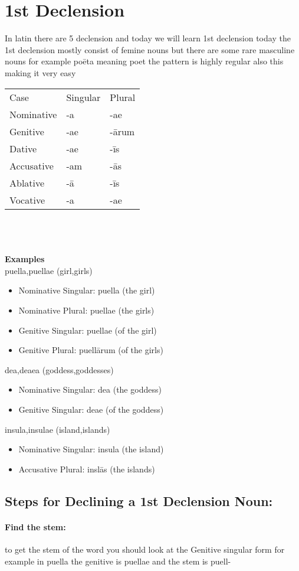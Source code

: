 \section*{1st Declension}
In latin there are 5 declension and today we will learn 1st 
declension today the 1st declension mostly consist of femine
nouns but there are some rare masculine nouns for example poēta meaning poet
the pattern is highly regular also this making it very easy \\
\begin{tabular}{lll}
  Case & Singular & Plural \\
  Nominative & -a & -ae \\ 
  Genitive & -ae &  -ārum \\ 
  Dative & -ae & -īs \\ 
  Accusative & -am & -ās \\ 
  Ablative & -ā & -īs \\ 
  Vocative & -a & -ae
\end{tabular}\\ \\ \\
\large{\textbf{Examples}}\\
puella,puellae (girl,girls)
\begin{itemize}
  \item Nominative Singular: puella (the girl)
  \item Nominative Plural: puellae (the girls)
  \item Genitive Singular: puellae (of the girl)
  \item Genitive Plural: puellārum (of the girls)
\end{itemize}
dea,deaea (goddess,goddesses)
\begin{itemize}
  \item Nominative Singular: dea (the goddess)
  \item Genitive Singular: deae (of the goddess)
\end{itemize}
insula,insulae (island,islands)
\begin{itemize}
  \item Nominative Singular: insula (the island)
  \item Accusative Plural: inslās (the islands)
\end{itemize}
\subsection*{Steps for Declining a 1st Declension Noun:}
\paragraph{Find the stem:}
to get the stem of the word you should look at the Genitive 
singular form for example in puella the genitive is puellae 
and the stem is puell-
